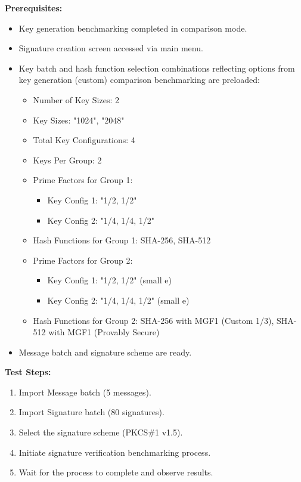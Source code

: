 \documentclass[]{final_report}
\theoremstyle{definition}
\begin{document}
\textbf{Prerequisites:}
\begin{itemize}
    \item Key generation benchmarking completed in comparison mode.
    \item Signature creation screen accessed via main menu.
    \item Key batch and hash function selection combinations  reflecting options from key generation (custom) comparison benchmarking are preloaded:
    \begin{itemize}
           \item Number of Key Sizes: 2
    \item Key Sizes: "1024", "2048"
    \item Total Key Configurations: 4
    \item Keys Per Group: 2
    \item Prime Factors for Group 1: 
        \begin{itemize}
            \item Key Config 1: "1/2, 1/2"
            \item Key Config 2: "1/4, 1/4, 1/2"
        \end{itemize}
    \item Hash Functions for Group 1: SHA-256, SHA-512
    \item Prime Factors for Group 2: 
        \begin{itemize}
            \item Key Config 1: "1/2, 1/2" (small e)
            \item Key Config 2: "1/4, 1/4, 1/2" (small e)
        \end{itemize}
    \item Hash Functions for Group 2: SHA-256 with MGF1 (Custom 1/3), SHA-512 with MGF1 (Provably Secure)
        \end{itemize}
    \item Message batch and signature scheme are ready.
\end{itemize}

\textbf{Test Steps:}
\begin{enumerate}
    \item Import Message batch (5 messages).
     \item Import Signature batch (80 signatures).
    \item Select the signature scheme (PKCS\#1 v1.5).
    \item Initiate signature verification benchmarking process.
    \item Wait for the process to complete and observe results.
\end{enumerate}
\end{document}
